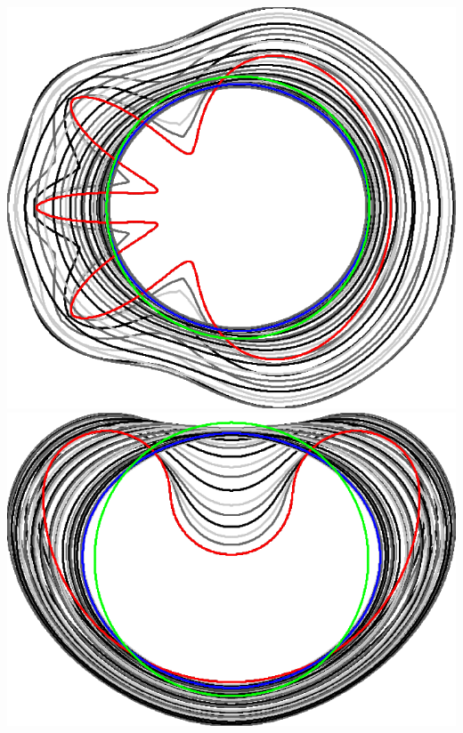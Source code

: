 \begin{frame}
\begin{minipage}{0.25\textwidth}
\includegraphics[scale=0.06]{figures/elastica-minimization/with-neighborhood-flow/radius_16/flower.png}\\[1em]
\includegraphics[scale=0.06]{figures/elastica-minimization/with-neighborhood-flow/radius_16/bean.png}
\end{minipage}%
%
%
\begin{minipage}{0.74\textwidth}
\center

\end{minipage}
\end{frame}
